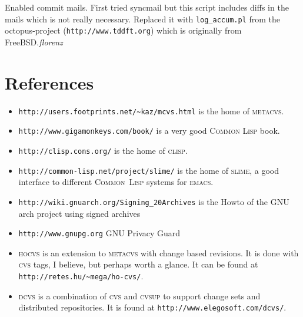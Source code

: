 \documentclass[fleqn, german, 10pt, a4paper]{article}
\begin{document}
Enabled commit mails. First tried syncmail but this script includes
diffs in the mails which is not really necessary. Replaced it with
\texttt{log\_accum.pl} from the octopus-project (\texttt{http://www.tddft.org})
which is originally from FreeBSD.\hfill{\textit{florenz}}

\section{References}

\begin{itemize}
\item \texttt{http://users.footprints.net/\textasciitilde{}kaz/mcvs.html} is the home of
\textsc{metacvs}.
\item \texttt{http://www.gigamonkeys.com/book/} is a very good
\textsc{Common Lisp} book.
\item \texttt{http://clisp.cons.org/} is the home of \textsc{clisp}.
\item \texttt{http://common-lisp.net/project/slime/} is the home of
\textsc{slime}, a good interface to different \textsc{Common~Lisp}
systems for \textsc{emacs}.
\item \texttt{http://wiki.gnuarch.org/Signing\_20Archives} is the Howto of the
GNU arch project using signed archives
\item \texttt{http://www.gnupg.org} GNU Privacy Guard
\item \textsc{hocvs} is an extension to \textsc{metacvs} with change based
revisions. It is done with \textsc{cvs} tags, I believe, but perhaps worth a
glance. It can be found at \texttt{http://retes.hu/\textasciitilde{}mega/ho-cvs/}.
\item \textsc{dcvs} is a combination of \textsc{cvs} and \textsc{cvsup}
to support change sets and distributed repositories. It is found
at \texttt{http://www.elegosoft.com/dcvs/}.
\end{itemize}
\end{document}
